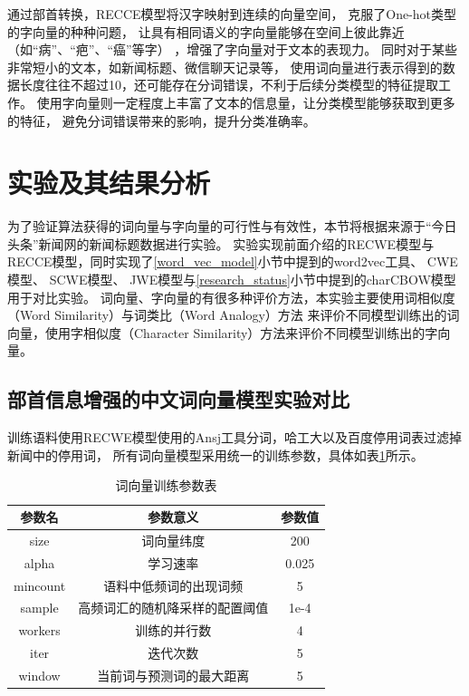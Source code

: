 通过部首转换，RECCE模型将汉字映射到连续的向量空间，
克服了One-hot类型的字向量的种种问题，
让具有相同语义的字向量能够在空间上彼此靠近（如“病”、“疤”、“癌”等字）
，增强了字向量对于文本的表现力。
同时对于某些非常短小的文本，如新闻标题、微信聊天记录等，
使用词向量进行表示得到的数据长度往往不超过10，还可能存在分词错误，不利于后续分类模型的特征提取工作。
使用字向量则一定程度上丰富了文本的信息量，让分类模型能够获取到更多的特征，
避免分词错误带来的影响，提升分类准确率。

\section{实验及其结果分析}
为了验证算法获得的词向量与字向量的可行性与有效性，本节将根据来源于“今日头条”新闻网的新闻标题数据进行实验。
实验实现前面介绍的RECWE模型与RECCE模型，同时实现了\ref{word_vec_model}小节中提到的word2vec工具、
CWE模型、
SCWE模型、
JWE模型与\ref{research_status}小节中提到的charCBOW模型用于对比实验。
词向量、字向量的有很多种评价方法，本实验主要使用词相似度（Word Similarity）与词类比（Word Analogy）方法
来评价不同模型训练出的词向量，使用字相似度（Character Similarity）方法来评价不同模型训练出的字向量。
\subsection{部首信息增强的中文词向量模型实验对比}
训练语料使用RECWE模型使用的Ansj工具分词，哈工大以及百度停用词表过滤掉新闻中的停用词，
所有词向量模型采用统一的训练参数，具体如表\ref{word_vec_arg_form}所示。
\begin{table}[h]
    \caption{词向量训练参数表}
    \begin{tabular}{|c|c|c|}
        \hline
        参数名 & 参数意义 & 参数值 \\
        \hline
        size & 词向量纬度 & 200 \\
        \hline
        alpha & 学习速率 & 0.025 \\
        \hline
        mincount & 语料中低频词的出现词频 & 5 \\
        \hline
        sample & 高频词汇的随机降采样的配置阈值 & 1e-4 \\
        \hline
        workers & 训练的并行数 & 4 \\
        \hline
        iter & 迭代次数 & 5 \\
        \hline
        window & 当前词与预测词的最大距离 & 5 \\
        \hline
    \end{tabular}
    \label{word_vec_arg_form}
    \end{table}

